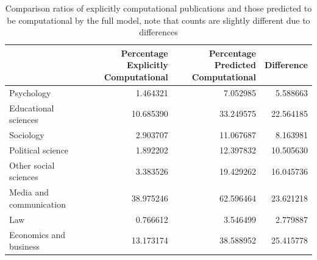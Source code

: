 \documentclass[12pt, a4paper]{article}
\begin{document}
\begin{table}[H]
	\centering
	\begin{adjustbox}{center}
		\begin{tabular}{lrrr}
			\toprule
			{} &   \pbox{20cm}{Percentage\\Explicitly Computational}  &  \pbox{20cm}{Percentage\\Predicted Computational} &  Difference \\
			\midrule
			Psychology              &  \num{1.464321} &  \num{7.052985} &   \num{5.588663} \\
			Educational sciences    & \num{10.685390} & \num{33.249575} &  \num{22.564185} \\
			Sociology               &  \num{2.903707} & \num{11.067687} &   \num{8.163981} \\
			Political science       &  \num{1.892202} & \num{12.397832} &  \num{10.505630} \\
			Other social sciences   &  \num{3.383526} & \num{19.429262} &  \num{16.045736} \\
			Media and communication & \num{38.975246} & \num{62.596464} &  \num{23.621218} \\
			Law                     &  \num{0.766612} &  \num{3.546499} &   \num{2.779887} \\
			Economics and business  & \num{13.173174} & \num{38.588952} &  \num{25.415778} \\
			\bottomrule
		\end{tabular}
	\end{adjustbox}
	\caption{Comparison ratios of  explicitly computational publications and those predicted to be computational by the full model, note that counts are slightly different due to differences }\label{ret_full}
\end{table}
\end{document}
